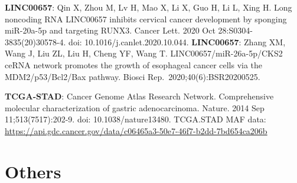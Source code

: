 \documentclass[
  12pt,
]{book}
\theoremstyle{definition}
\theoremstyle{definition}
\theoremstyle{definition}
\theoremstyle{definition}
\theoremstyle{remark}
\begin{document}
\textbf{LINC00657}: Qin X, Zhou M, Lv H, Mao X, Li X, Guo H, Li L, Xing H. Long noncoding RNA LINC00657 inhibits cervical cancer development by sponging miR-20a-5p and targeting RUNX3. Cancer Lett. 2020 Oct 28:S0304-3835(20)30578-4. doi: 10.1016/j.canlet.2020.10.044.
\textbf{LINC00657}: Zhang XM, Wang J, Liu ZL, Liu H, Cheng YF, Wang T. LINC00657/miR-26a-5p/CKS2 ceRNA network promotes the growth of esophageal cancer cells via the MDM2/p53/Bcl2/Bax pathway. Biosci Rep.~2020;40(6):BSR20200525.

\textbf{TCGA-STAD}: Cancer Genome Atlas Research Network. Comprehensive molecular characterization of gastric adenocarcinoma. Nature. 2014 Sep 11;513(7517):202-9. doi: 10.1038/nature13480.
TCGA.STAD MAF data: \url{https://api.gdc.cancer.gov/data/c06465a3-50e7-46f7-b2dd-7bd654ca206b}

\hypertarget{others}{%
\section{Others}\label{others}}
\end{document}
